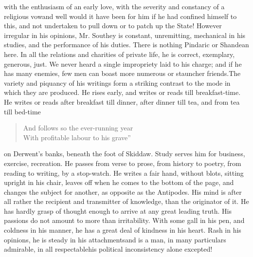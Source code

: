 with the enthusiasm of an early love, with the severity and
constancy of a religious vow\textemdash and well would it have
been for him if he had confined himself to this, and not
undertaken to pull down or to patch up the State! However
irregular in his opinions, Mr. Southey is constant, unremitting,
mechanical in his studies, and the performance of his
duties. There is nothing Pindaric or Shandean here. In all the
relations and charities of private life, he is correct, exemplary,
generous, just.  We never heard a single impropriety laid to his
charge; and if he has many enemies, few men can boast more
numerous or stauncher friends.\textemdash The variety and piquancy
of his writings form a striking contrast to the mode in which they
are produced. He rises early, and writes or reads till
breakfast-time. He writes or reads after breakfast till dinner,
after dinner till tea, and from tea till bed-time\textemdash
\begin{verse}
  And follows so the ever-running year\\
  With profitable labour to his grave\textemdash ''
\end{verse}
on Derwent's banks, beneath the foot of Skiddaw. Study serves him
for business, exercise, recreation. He passes from verse to prose,
from history to poetry, from reading to writing, by a
stop-watch. He writes a fair hand, without blots, sitting upright
in his chair, leaves off when he comes to the bottom of the page,
and changes the subject for another, as opposite as the
Antipodes. His mind is after all rather the recipient and
transmitter of knowledge, than the originator of it. He has hardly
grasp of thought enough to arrive at any great leading truth. His
passions do not amount to more than irritability. With some gall
in his pen, and coldness in his manner, he has a great deal of
kindness in his heart. Rash in his opinions, he is steady in his
attachments\textemdash and is a man, in many particulars
admirable, in all respectable\textemdash his political
inconsistency alone excepted!

